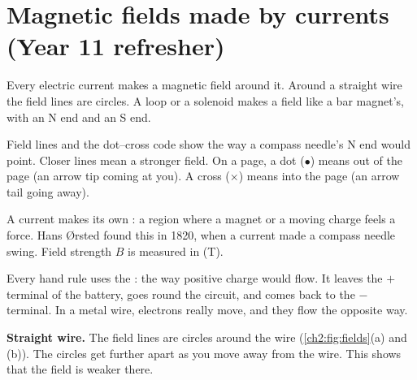 \section{Magnetic fields made by currents (Year 11 refresher)}\label{ch2:sec:fields}

\begin{bigidea}
Every electric current makes a magnetic field around it. Around a straight wire the field lines
are circles. A loop or a solenoid makes a field like a bar magnet's, with an N end and an S end.
\end{bigidea}

\begin{keywords}
\end{keywords}

\begin{refresher}{Field lines and the dot--cross code}
 show the way a compass needle's N end would point. Closer lines mean a stronger
field. On a page, a dot ($\bullet$) means out of the page (an arrow tip coming at you). A cross
($\times$) means into the page (an arrow tail going away).
\end{refresher}

A current makes its own : a region where a magnet or a moving charge feels a
force. Hans Ørsted found this in 1820, when a current made a compass needle swing. Field strength
$B$ is measured in  (T).

Every hand rule uses the : the way positive charge would flow. It
leaves the $+$ terminal of the battery, goes round the circuit, and comes back to the $-$
terminal. In a metal wire, electrons really move, and they flow the opposite way.

\textbf{Straight wire.} The field lines are circles around the wire (\cref{ch2:fig:fields}(a)
and (b)). The circles get further apart as you move away from the wire. This shows that the field
is weaker there.

